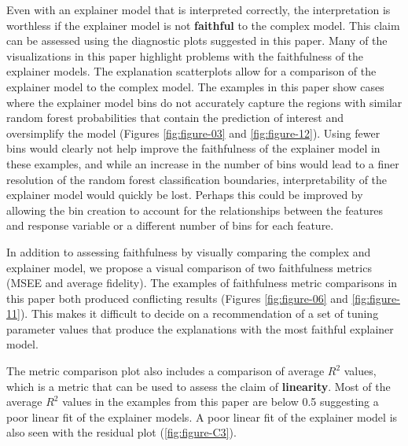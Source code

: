 \documentclass[AMS,STIX2COL]{WileyNJD-v2}\usepackage[]{graphicx}\usepackage[]{color}
\begin{document}
Even with an explainer model that is interpreted correctly, the interpretation is worthless if the explainer model is not \textbf{faithful} to the complex model. This claim can be assessed using the diagnostic plots suggested in this paper. Many of the visualizations in this paper highlight problems with the faithfulness of the explainer models. The explanation scatterplots allow for a comparison of the explainer model to the complex model. The examples in this paper show cases where the explainer model bins do not accurately capture the regions with similar random forest probabilities that contain the prediction of interest and oversimplify the model (Figures \ref{fig:figure-03} and \ref{fig:figure-12}). Using fewer bins would clearly not help improve the faithfulness of the explainer model in these examples, and while an increase in the number of bins would lead to a finer resolution of the random forest classification boundaries, interpretability of the explainer model would quickly be lost. Perhaps this could be improved by allowing the bin creation to account for the relationships between the features and response variable or a different number of bins for each feature.

In addition to assessing faithfulness by visually comparing the complex and explainer model, we propose a visual comparison of two faithfulness metrics (MSEE and average fidelity). The examples of faithfulness metric comparisons in this paper both produced conflicting results (Figures \ref{fig:figure-06} and \ref{fig:figure-11}). This makes it difficult to decide on a recommendation of a set of tuning parameter values that produce the explanations with the most faithful explainer model.

The metric comparison plot also includes a comparison of average $R^2$ values, which is a metric that can be used to assess the claim of \textbf{linearity}. Most of the average $R^2$ values in the examples from this paper are below 0.5 suggesting a poor linear fit of the explainer models. A poor linear fit of the explainer model is also seen with the residual plot (\autoref{fig:figure-C3}).
\end{document}
